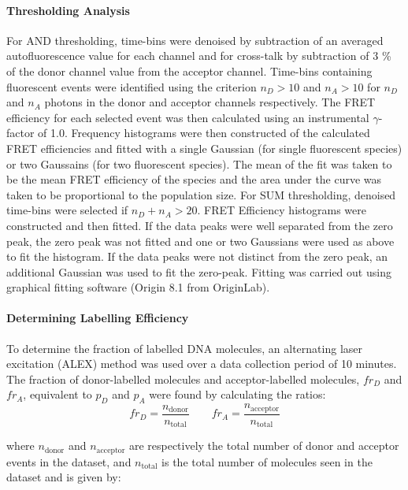 \paragraph*{Thresholding Analysis}
\label{subsect:thresholding}
For AND thresholding, time-bins were denoised by subtraction of an averaged autofluorescence value for each channel and for cross-talk by subtraction of 3 \% of the donor channel value from the acceptor channel. Time-bins containing fluorescent events were identified using the criterion $n_D > 10$ and $n_A > 10$ for $n_D$ and $n_A$ photons in the donor and acceptor channels respectively. The FRET efficiency for each selected event was then calculated using an instrumental $\gamma$-factor of 1.0. Frequency histograms were then constructed of the calculated FRET efficiencies and fitted with a single Gaussian (for single fluorescent species) or two Gaussains (for two fluorescent species). The mean of the fit was taken to be the mean FRET efficiency of the species and the area under the curve was taken to be proportional to the population size. For SUM thresholding, denoised time-bins were selected if $n_D + n_A > 20$. FRET Efficiency histograms were constructed and then fitted. If the data peaks were well separated from the zero peak, the zero peak was not fitted and one or two Gaussians were used as above to fit the histogram. If the data peaks were not distinct from the zero peak, an additional Gaussian was used to fit the zero-peak. Fitting was carried out using graphical fitting software (Origin 8.1 from OriginLab). 

\paragraph*{Determining Labelling Efficiency}
To determine the fraction of labelled DNA molecules, an alternating laser excitation (ALEX) method was used over a data collection period of 10 minutes. The fraction of donor-labelled molecules and acceptor-labelled molecules, $fr_D$ and $fr_A$, equivalent to $p_D$ and $p_A$ were found by calculating the ratios:
\begin{equation}
fr_D = \frac{n_{\text{donor}}}{n_{\text{total}}} \qquad fr_A = \frac{n_{\text{acceptor}}}{n_{\text{total}}}
\label{eq:label}
\end{equation}

where $n_{\text{donor}}$ and $n_{\text{acceptor}}$ are respectively the total number of donor and acceptor events in the dataset, and $n_{\text{total}}$ is the total number of molecules seen in the dataset and is given by:
 
